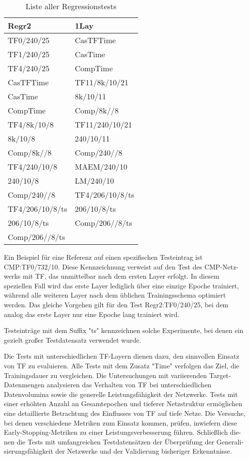 \begin{table}[!ht]
    \centering
    \begin{tabular}{l|l}
        \textbf{Regr2} & \textbf{1Lay} \\
        \hline
        TF0/240/25 & CasTFTime \\
        TF1/240/25 & CasTime \\
        TF4/240/25 & CompTime \\
        CasTFTime & TF11/8k/10/21 \\
        CasTime & 8k/10/11 \\
        CompTime & Comp/8k//8 \\
        TF4/8k/10/8 & TF11/240/10/21 \\
        8k/10/8 & 240/10/11 \\
        Comp/8k//8 & Comp/240//8 \\
        TF4/240/10/8 & MAEM/240/10 \\
        240/10/8 & LM/240/10 \\
        Comp/240//8 & TF4/206/10/8/ts \\
        TF4/206/10/8/ts & 206/10/8/ts \\
        206/10/8/ts & Comp/206//8/ts \\
        Comp/206//8/ts &
    \end{tabular}
    \caption{\label{tab:regrtests} Liste aller Regressionstests}
\end{table}

Ein Beispiel für eine Referenz auf einen spezifischen Testeintrag ist \\CMP:TF0/732/10. Diese Kennzeichnung verweist auf den Test des 
CMP-Netz-werks mit TF, das unmittelbar nach dem ersten Layer erfolgt. In diesem speziellen Fall wird das erste Layer 
lediglich über eine einzige Epoche trainiert, während alle weiteren Layer nach dem üblichen Trainingsschema optimiert werden. Das gleiche 
Vorgehen gilt für den Test Regr2:TF0/240/25, bei dem analog das erste Layer nur eine Epoche lang trainiert wird.

Testeinträge mit dem Suffix "ts" kennzeichnen solche Experimente, bei denen ein gezielt großer Testdatensatz verwendet wurde.

Die Tests mit unterschiedlichen TF-Layern dienen dazu, den sinnvollen Einsatz von TF zu evaluieren. Alle Tests mit dem Zusatz "Time" verfolgen 
das Ziel, die Trainingsdauer zu vergleichen. Die Untersuchungen mit variierenden Target-Datenmengen analysieren das Verhalten 
von TF bei unterschiedlichen Datenvolumina sowie die generelle Leistungsfähigkeit der Netzwerke. Tests mit einer erhöhten Anzahl an 
Gesamtepochen und tieferer Netzstruktur ermöglichen eine detaillierte Betrachtung des Einflusses von TF auf tiefe Netze. Die Versuche, bei denen 
verschiedene Metriken zum Einsatz kommen, prüfen, inwiefern diese Early-Stopping-Metriken zu einer Leistungsverbesserung führen. Schließlich 
die-nen die Tests mit umfangreichen Testdatensätzen der Überprüfung der Generali-sierungsfähigkeit der Netzwerke und der Validierung bisheriger 
Erkenntnisse.
